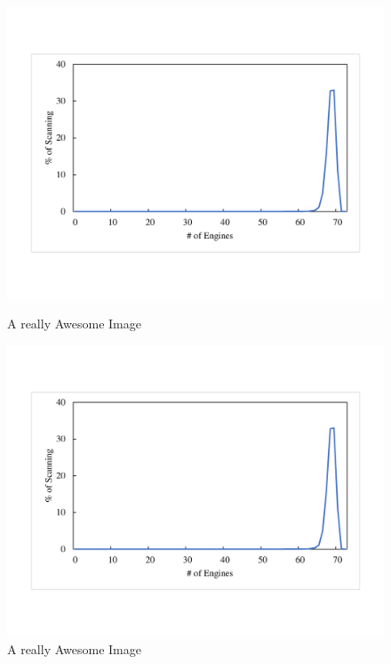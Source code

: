 \begin{figure}[!htb]
  \includegraphics[width=\linewidth]{figure/engine_distribution}
  \caption{A really Awesome Image}\label{fig:awesome_image1}
\endminipage\hfill
{}
  \includegraphics[width=\linewidth]{figure/engine_distribution}
  \caption{A really Awesome Image}\label{fig:awesome_image2}
\endminipage\hfill
\end{figure}
